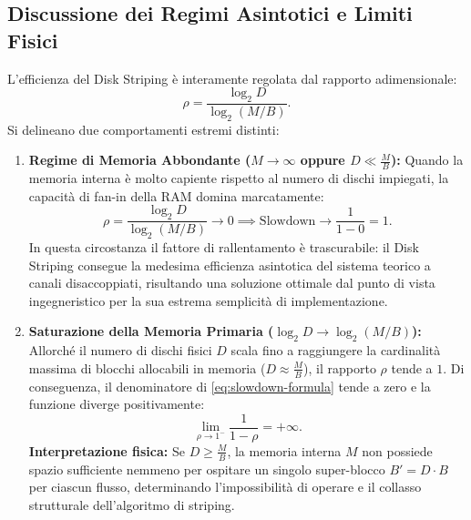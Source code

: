 \FloatBarrier
\subsection{Discussione dei Regimi Asintotici e Limiti Fisici}
\label{subsec:striping-limits}

L'efficienza del Disk Striping è interamente regolata dal rapporto adimensionale:
\begin{equation}
  \rho = \frac{\log_2 D}{\log_2(M / B)}.
\end{equation}
Si delineano due comportamenti estremi distinti:

\begin{enumerate}
  \item \textbf{Regime di Memoria Abbondante ($M \to \infty$ oppure $D \ll \frac{M}{B}$):}
  Quando la memoria interna è molto capiente rispetto al numero di dischi impiegati, la capacità di fan-in della RAM domina marcatamente:
  \begin{equation}
    \rho = \frac{\log_2 D}{\log_2(M / B)} \to 0 \implies \text{Slowdown} \to \frac{1}{1 - 0} = 1.
  \end{equation}
  In questa circostanza il fattore di rallentamento è trascurabile: il Disk Striping consegue la medesima efficienza asintotica del sistema teorico a canali disaccoppiati, risultando una soluzione ottimale dal punto di vista ingegneristico per la sua estrema semplicità di implementazione.

  \item \textbf{Saturazione della Memoria Primaria ($\log_2 D \to \log_2(M/B)$):}
  Allorché il numero di dischi fisici $D$ scala fino a raggiungere la cardinalità massima di blocchi allocabili in memoria ($D \approx \frac{M}{B}$), il rapporto $\rho$ tende a $1$. Di conseguenza, il denominatore di \eqref{eq:slowdown-formula} tende a zero e la funzione diverge positivamente:
  \begin{equation}
    \lim_{\rho \to 1^-} \frac{1}{1 - \rho} = +\infty.
  \end{equation}
  \textbf{Interpretazione fisica:} Se $D \ge \frac{M}{B}$, la memoria interna $M$ non possiede spazio sufficiente nemmeno per ospitare un singolo super-blocco $B' = D \cdot B$ per ciascun flusso, determinando l'impossibilità di operare e il collasso strutturale dell'algoritmo di striping.
\end{enumerate}
